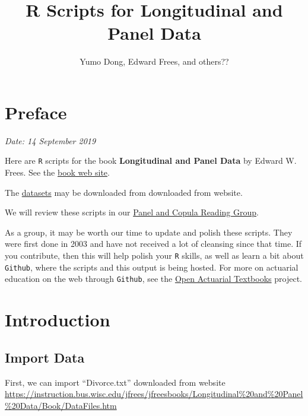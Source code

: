 \documentclass[]{book}
\title{R Scripts for Longitudinal and Panel Data}
\author{Yumo Dong, Edward Frees, and others??}
\date{}
\begin{document}
\maketitle

{
\setcounter{tocdepth}{2}
\tableofcontents
}
\hypertarget{preface}{%
\chapter*{Preface}\label{preface}}

\emph{Date: 14 September 2019}

Here are \texttt{R} scripts for the book \textbf{Longitudinal and Panel Data} by Edward W. Frees. See the \href{https://instruction.bus.wisc.edu/jfrees/jfreesbooks/Longitudinal\%20and\%20Panel\%20Data/Book/PDataBook.htm}{book web site}.

The \href{https://instruction.bus.wisc.edu/jfrees/jfreesbooks/Longitudinal\%20and\%20Panel\%20Data/Book/DataFiles.htm}{datasets} may be downloaded from downloaded from website.

We will review these scripts in our \href{https://sites.google.com/a/wisc.edu/copula-study-group/}{Panel and Copula Reading Group}.

As a group, it may be worth our time to update and polish these scripts. They were first done in 2003 and have not received a lot of cleansing since that time. If you contribute, then this will help polish your \texttt{R} skills, as well as learn a bit about \texttt{Github}, where the scripts and this output is being hosted. For more on actuarial education on the web through \texttt{Github}, see the \href{https://ewfrees.github.io/}{Open Actuarial Textbooks} project.

\hypertarget{introduction}{%
\chapter{Introduction}\label{introduction}}

\hypertarget{import-data}{%
\section{Import Data}\label{import-data}}

First, we can import ``Divorce.txt'' downloaded from website \url{https://instruction.bus.wisc.edu/jfrees/jfreesbooks/Longitudinal\%20and\%20Panel\%20Data/Book/DataFiles.htm}
\end{document}
